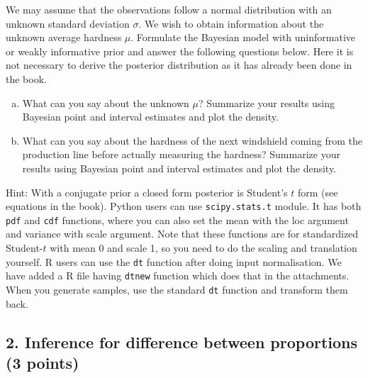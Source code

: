\documentclass[a4paper,11pt]{article}
\begin{document}
We may assume that the observations follow a normal distribution with
an unknown standard deviation $\sigma$. We wish to obtain information
about the unknown average hardness $\mu$. Formulate the Bayesian model
with uninformative or weakly informative prior and answer the
following questions below. Here it is not necessary to derive the posterior distribution as it has already been done in the book. 
\begin{enumerate}[a)]
\item What can you say about the unknown $\mu$? Summarize your results
  using Bayesian point and interval estimates and plot the density. 
\item What can you say about the hardness of the next windshield
  coming from the production line before actually measuring the
  hardness? Summarize your results using Bayesian point and interval estimates and plot the density.
\end{enumerate}
Hint: With a conjugate prior a closed form posterior is Student's $t$
form (see equations in the book). 
Python users can use {\tt scipy.stats.t} module. It has both {\tt pdf} and {\tt cdf} functions, where you can also set the mean with the  loc argument and variance with scale argument. Note that these functions are for standardized
Student-$t$ with mean 0 and scale 1, so you need to do the scaling and
translation yourself.
R users can use the {\tt dt} function after doing input normalisation. We have added a R file having {\tt dtnew} function which does that in the attachments. When you generate samples, use the standard {\tt dt} function and transform them back.


\subsection*{2. Inference for difference between proportions (3 points)}
\end{document}
